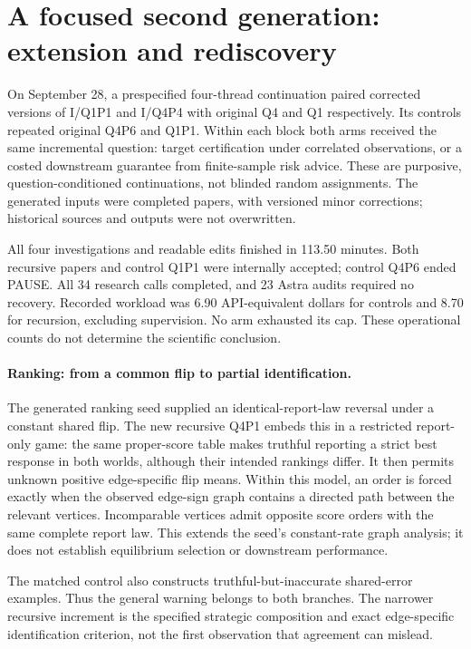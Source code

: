 \documentclass[11pt,a4paper]{article}
\begin{document}
\section{A focused second generation: extension and rediscovery}
\label{sec:second-generation}

On September 28, a prespecified four-thread continuation paired corrected
versions of I/Q1P1 and I/Q4P4 with original Q4 and Q1 respectively. Its controls
repeated original Q4P6 and Q1P1. Within each block both arms received the same
incremental question: target certification under correlated observations,
or a costed downstream guarantee from finite-sample risk advice. These are
purposive, question-conditioned continuations, not blinded random assignments.
The generated inputs were completed papers, with versioned minor corrections;
historical sources and outputs were not overwritten.

All four investigations and readable edits finished in 113.50 minutes.
Both recursive papers and control Q1P1 were internally accepted; control
Q4P6 ended PAUSE. All 34 research calls completed, and 23 Astra audits required
no recovery. Recorded workload was 6.90 API-equivalent dollars for controls
and 8.70 for recursion, excluding supervision. No arm exhausted its cap.
These operational counts do not determine the scientific conclusion.

\paragraph{Ranking: from a common flip to partial identification.}
The generated ranking seed supplied an identical-report-law reversal under
a constant shared flip. The new recursive Q4P1 embeds this in a restricted
report-only game: the same proper-score table makes truthful reporting a
strict best response in both worlds, although their intended rankings differ.
It then permits unknown positive edge-specific flip means. Within this model,
an order is forced exactly when the observed edge-sign graph contains a
directed path between the relevant vertices. Incomparable vertices admit
opposite score orders with the same complete report law. This extends the
seed's constant-rate graph analysis; it does not establish equilibrium
selection or downstream performance.

The matched control also constructs truthful-but-inaccurate shared-error
examples. Thus the general warning belongs to both branches. The narrower
recursive increment is the specified strategic composition and exact
edge-specific identification criterion, not the first observation that
agreement can mislead.
\end{document}
